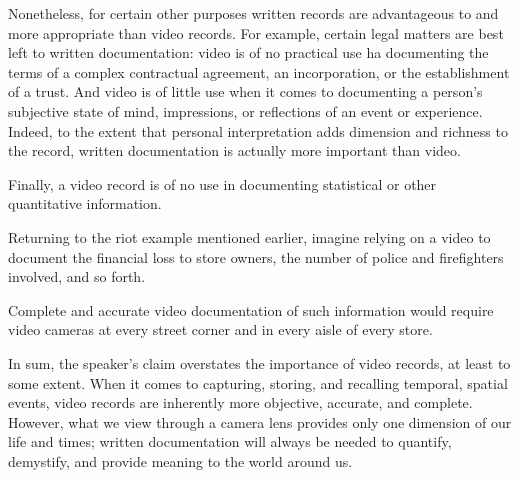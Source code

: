 Nonetheless, for certain other purposes written records are advantageous to and more appropriate than video records.
For example, certain legal matters are best left to written documentation: video is of no practical use ha documenting the terms of a complex contractual agreement, an incorporation, or the establishment of a trust.
And video is of little use when it comes to documenting a person's subjective state of mind, impressions, or reflections of an event or experience.
Indeed, to the extent that personal interpretation adds dimension and richness to the record, written documentation is actually more important than video.


Finally, a video record is of no use in documenting statistical or other quantitative information.


Returning to the riot example mentioned earlier, imagine relying on a video to document the financial loss to store owners, the number of police and firefighters involved, and so forth.


Complete and accurate video documentation of such information would require video cameras at every street corner and in every aisle of every store.


In sum, the speaker's claim overstates the importance of video records, at least to some extent.
When it comes to capturing, storing, and recalling temporal, spatial events, video records are inherently more objective, accurate, and complete.
However, what we view through a camera lens provides only one dimension of our life and times; written documentation will always be needed to quantify, demystify, and provide meaning to the world around us.
